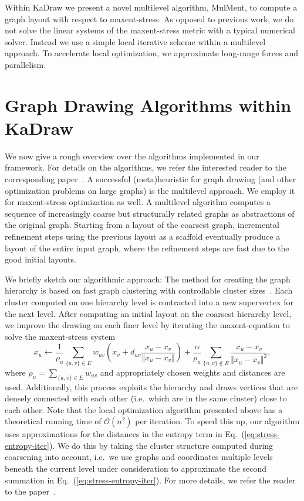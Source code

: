 \documentclass[11pt]{article}
\newcommand{\ie}{i.e.\ }
\begin{document}
Within KaDraw we present a novel multilevel algorithm, MulMent, to compute a graph layout with respect to maxent-stress.
%
As opposed to previous work, we do not solve the linear systems of the maxent-stress metric with a typical 
numerical solver. Instead we use a simple local iterative scheme within a multilevel approach.
To accelerate local optimization, we approximate long-range forces and parallelism.

\section{Graph Drawing Algorithms within KaDraw}
We now give a rough overview over the algorithms implemented in our framework. For details on the algorithms, we refer the interested reader to the corresponding paper~\cite{mulment}. 
A successful (meta)heuristic for graph drawing (and other optimization problems on large graphs) is the multilevel approach. We employ it for maxent-stress optimization as well.
A multilevel algorithm computes a sequence of increasingly coarse but structurally related graphs as abstractions of the original graph.
Starting from a layout of the coarsest graph, incremental refinement steps using the previous layout as a scaffold eventually produce a layout of the entire input graph, where the refinement steps are fast due to the good initial layouts. 

We briefly sketch our algorithmic 
approach: The method for creating the graph hierarchy is based on fast graph clustering with 
controllable cluster sizes~\cite{pcomplexnetworksviacluster}. 
Each cluster computed on one hierarchy level is contracted into a new supervertex for the next level.
After computing an initial layout on the coarsest hierarchy level, we improve the drawing 
on each finer level by iterating the maxent-equation to solve the maxent-stress system 
\begin{equation}
	x_{u} \gets \frac{1}{\rho_{u}} \sum_{\{u,v\}\in E} w_{uv} \left(x_{v} + d_{uv} \frac{x_{u}-x_{v}}{\Vert x_{u}-x_{v}\Vert}\right) + \frac{\alpha}{\rho_{u}} \sum_{\{u,v\}\notin E} \frac{x_{u}-x_{v}}{\Vert x_{u}-x_{v}\Vert^{2}},
\label{eq:stress-entropy-iter}
\end{equation}
where $\rho_{u}=\sum_{\{u,v\}\in E}w_{uv}$ and appropriately chosen weights and distances are used. 
Additionally, this process exploits
the hierarchy and draws vertices that are densely connected with each other (\ie which are in the same cluster) close to each other.
Note that the local optimization algorithm presented above has a theoretical running time of $\mathcal{O}(n^2)$ per iteration.
To speed this up, our algorithm uses approximations for the distances in the entropy term in Eq.~(\ref{eq:stress-entropy-iter}).
We do this by taking the cluster structure computed during coarsening into account, \ie we use graphs and coordinates multiple levels beneath the current level under consideration to approximate the second summation in Eq.~(\ref{eq:stress-entropy-iter}). For more details, we refer the reader to the paper~\cite{mulment}.
\end{document}
